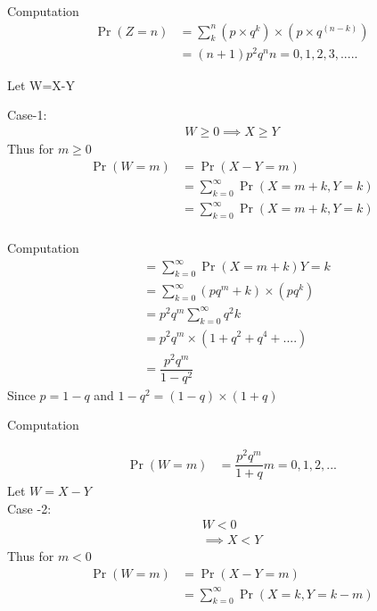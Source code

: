 \documentclass{beamer}
\providecommand{\pr}[1]{\ensuremath{\Pr\left(#1\right)}}
\begin{document}
	\begin{frame}{Computation}
	    \begin{align}
	       \pr{Z=n}&=\sum\limits_{k}^n (p \times q^k) \times (p \times q^(n-k))\\
         &=(n+1)p^2 q^n  n=0,1,2,3,.....
	    \end{align}
\begin{enumerate}[label=(\alph*)]
  	    
    Let W=X-Y\\
    \end{enumerate}
	 Case-1:
	    \begin{align}
	     W \geq 0 \implies X \geq Y
	     \end{align}
	 Thus for $ m \geq 0$
	 \begin{align}
	 \pr{W=m} &= \pr{X-Y=m}\\
     &=\sum\limits_{k=0}^\infty \pr{X=m+k,Y=k}\\
     &=\sum\limits_{k=0}^\infty \pr{X=m+k,Y=k}\\
     \end{align}
     \end{frame}
     
     \begin{frame}{Computation}
     \begin{align}
     &=\sum\limits_{k=0}^\infty \pr{X=m+k}{Y=k}\\
     &=\sum\limits_{k=0}^\infty (p q^m+k) \times (p q^k)\\
     &=p^2 q^m \sum\limits_{k=0}^\infty q^2k\\
     &=p^2 q^m \times (1+q^2 + q^4 +....)\\
     &=\dfrac{p^2 q^m}{1-q^2}
     \end{align}
      Since $p=1-q$ and $1-q^2=(1-q) \times (1+q)$
	
	 \end{frame}
	 
	 \begin{frame}{Computation}
	 
	 \begin{align}
	 \label{eq:eq1}
	 \pr{W=m} &=\dfrac{p^2 q^m}{1+q}  m=0,1,2,...
	 \end{align}
      Let $W=X-Y$\\
      Case -2:
      \begin{align}
	     W < 0\\
	 \implies X < Y
	  \end{align}
	 Thus for $m < 0$\\
	 \begin{align}
	 \pr{W=m} &= \pr{X-Y=m}\\
     &=\sum\limits_{k=0}^\infty \pr{X=k,Y=k-m}
     \end{align}
     \end{frame}
     
\end{document}
